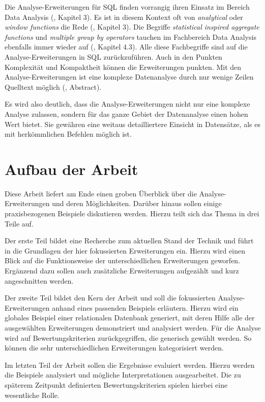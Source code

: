 Die Analyse-Erweiterungen für SQL finden vorrangig ihren Einsatz im Bereich Data
Analysis (\cite{FOTACHE2015243}, Kapitel 3). Es ist in diesem Kontext oft von \textit{analytical}
oder \textit{window functions} die Rede (\cite{FOTACHE2015243}, Kapitel 3). Die Begriffe
\textit{statistical inspired aggregate functions} und \textit{multiple group by
operators} tauchen im Fachbereich Data Analysis ebenfalls immer wieder auf (\cite{FOTACHE2015243},
Kapitel 4.3). Alle diese Fachbegriffe sind auf die Analyse-Erweiterungen in SQL zurückzuführen.
Auch in den Punkten Komplexität und Kompaktheit können die Erweiterungen punkten.
Mit den Analyse-Erweiterungen ist eine komplexe Datenanalyse durch nur wenige Zeilen
Quelltext möglich (\cite{Maue2022}, Abstract).

Es wird also deutlich, dass die Analyse-Erweiterungen nicht nur eine komplexe Analyse
zulassen, sondern für das ganze Gebiet der Datenanalyse einen hohen Wert bietet.
Sie gewähren eine weitaus detailliertere Einsicht in Datensätze, als es mit
herkömmlichen Befehlen möglich ist.

\section{Aufbau der Arbeit}
Diese Arbeit liefert am Ende einen groben Überblick über die Analyse-Erweiterungen
und deren Möglichkeiten. Darüber hinaus sollen einige praxisbezogenen Beispiele diskutieren
werden. Hierzu teilt sich das Thema in drei Teile auf.

Der erste Teil bildet eine Recherche zum aktuellen Stand der Technik und führt
in die Grundlagen der hier fokussierten Erweiterungen ein. Hierzu wird einen Blick
auf die Funktionsweise der unterschiedlichen Erweiterungen geworfen. Ergänzend
dazu sollen auch zusätzliche Erweiterungen aufgezählt und kurz angeschnitten
werden.

Der zweite Teil bildet den Kern der Arbeit und soll die fokussierten Analyse-Erweiterungen
anhand eines passenden Beispiels erläutern. Hierzu wird ein globales Beispiel einer
relationalen Datenbank generiert, mit deren Hilfe alle der ausgewählten
Erweiterungen demonstriert und analysiert werden. Für die Analyse wird auf Bewertungskriterien
zurückgegriffen, die generisch gewählt werden. So können die sehr unterschiedlichen
Erweiterungen kategorisiert werden.

Im letzten Teil der Arbeit sollen die Ergebnisse evaluiert werden. Hierzu werden
die Beispiele analysiert und mögliche Interpretationen ausgearbeitet. Die zu späterem
Zeitpunkt definierten Bewertungskriterien spielen hierbei eine wesentliche Rolle.

